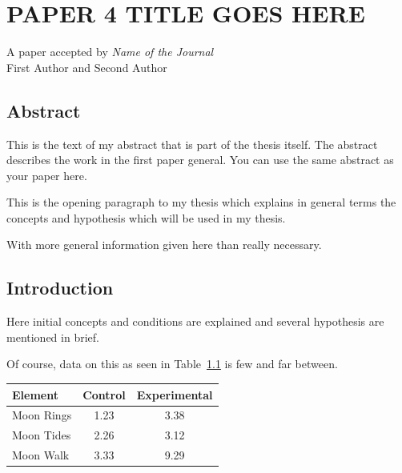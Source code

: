 \chapter{PAPER 4 TITLE GOES HERE}

\begin{center}
    A paper accepted by \textit{Name of the Journal} \\
    First Author and Second Author
\end{center}

\section{Abstract}
This is the text of my abstract that is part of the thesis itself.
The abstract describes the work in the first paper general. You can use the same abstract as your paper here.



This is the opening paragraph to my thesis which
explains in general terms the concepts and hypothesis
which will be used in my thesis.

With more general information given here than really
necessary.

\section{Introduction}

Here initial concepts and conditions are explained and
several hypothesis are mentioned in brief.

Of course, data on this as seen in Table~\ref{data}
is few and far between.

\begin{table}[h!tb] \centering
{}
\label{data}
\begin{tabular}{lcc} \hline
\textbf{Element} & \textbf{Control} & \textbf{Experimental} \\ \hline
Moon Rings & 1.23 & 3.38 \\
Moon Tides & 2.26 & 3.12 \\
Moon Walk & 3.33 & 9.29 \\ \hline
\end{tabular}
\end{table}


